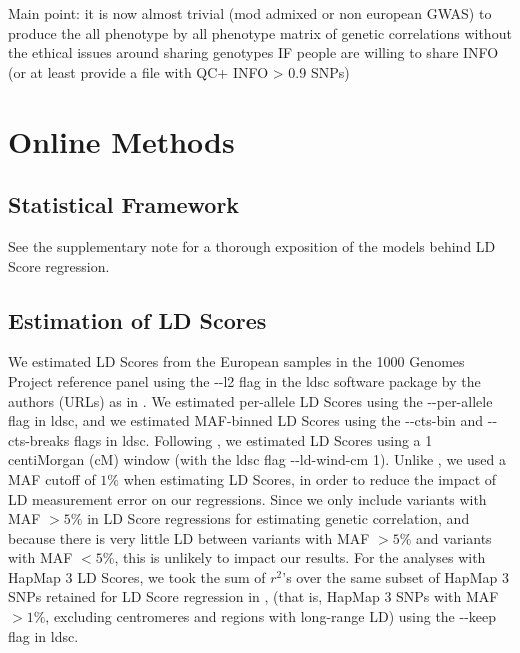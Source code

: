 \documentclass[11pt]{article}
\begin{document}
Main point: it is now almost trivial (mod admixed or non european GWAS)
to produce the all phenotype by all phenotype matrix of genetic correlations without 
the ethical issues around sharing genotypes IF people are willing to share INFO
(or at least provide a file with QC+ INFO > 0.9 SNPs)

\newpage
\section{Online Methods}\label{Online Methods}

\subsection{Statistical Framework}

See the supplementary note for a thorough exposition of the models behind LD Score regression.

\subsection{Estimation of LD Scores}

We estimated LD Scores from the European samples in the 1000 Genomes Project \cite{10002012integrated}
reference panel using the {-}{-}l2 flag in the ldsc software package by the authors (URLs) as in \cite{buliksullivan2014}.
We estimated per-allele LD Scores using the {-}{-}per-allele flag in ldsc, and
we estimated MAF-binned LD Scores using the {-}{-}cts-bin and {-}{-}cts-breaks flags in ldsc.
Following \cite{buliksullivan2014}, we estimated LD Scores using a 1 centiMorgan (cM) window
(with the ldsc flag {-}{-}ld-wind-cm 1).
Unlike \cite{buliksullivan2014}, we used a MAF cutoff of $1\%$ when estimating LD Scores,
in order to reduce the impact of LD measurement error on our regressions.
Since we only include variants with MAF $> 5\%$ in LD Score regressions for estimating genetic correlation,
and because there is very little LD between variants with MAF $> 5\%$ and variants with MAF $< 5\%$, 
this is unlikely to impact our results. For the analyses with HapMap 3 \cite{international2010integrating} LD Scores,
we took the sum of $r^2$'s over the same subset of HapMap 3 SNPs retained for LD Score regression in
\cite{buliksullivan2014}, (that is, HapMap 3 SNPs with MAF $> 1\%$, excluding centromeres and regions with long-range LD)
using the {-}{-}keep flag in ldsc.
\end{document}
